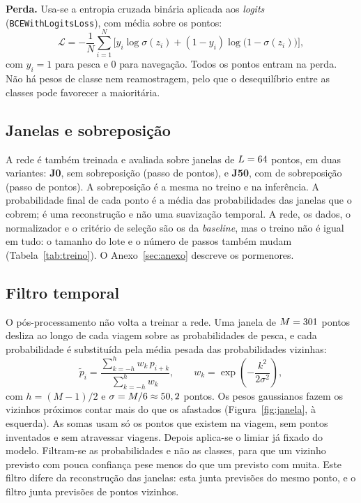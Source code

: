 \documentclass{article}
\begin{document}
\textbf{Perda.} Usa-se a entropia cruzada binária aplicada aos \emph{logits} (\texttt{BCEWithLogitsLoss}), com média sobre os pontos:
\begin{equation}
\mathcal{L}=-\frac1N\sum_{i=1}^{N}\Big[y_i\log\sigma(z_i)+(1-y_i)\log\big(1-\sigma(z_i)\big)\Big],
\end{equation}
com $y_i=1$ para pesca e $0$ para navegação. Todos os pontos entram na perda. Não há pesos de classe nem reamostragem, pelo que o desequilíbrio entre as classes pode favorecer a maioritária.

\subsection{Janelas e sobreposição}
\label{sec:janelas}

A rede é também treinada e avaliada sobre janelas de $L=64$ pontos, em duas variantes: \textbf{J0}, sem sobreposição (passo de \resJZPasso{} pontos), e \textbf{J50}, com \resJCSobrep{} de sobreposição (passo de \resJCPasso{} pontos). A sobreposição é a mesma no treino e na inferência. A probabilidade final de cada ponto é a média das probabilidades das janelas que o cobrem; é uma reconstrução e não uma suavização temporal. A rede, os dados, o normalizador e o critério de seleção são os da \emph{baseline}, mas o treino não é igual em tudo: o tamanho do lote e o número de passos também mudam (Tabela~\ref{tab:treino}). O Anexo~\ref{sec:anexo} descreve os pormenores.

\subsection{Filtro temporal}
\label{sec:filtro}

O pós-processamento não volta a treinar a rede. Uma janela de $M=301$ pontos desliza ao longo de cada viagem sobre as probabilidades de pesca, e cada probabilidade é substituída pela média pesada das probabilidades vizinhas:
\begin{equation}
\tilde{p}_i=\frac{\sum_{k=-h}^{h} w_k\,p_{i+k}}{\sum_{k=-h}^{h} w_k},\qquad w_k=\exp\!\left(-\frac{k^2}{2\sigma^2}\right),
\end{equation}
com $h=(M-1)/2$ e $\sigma=M/6\approx50,2$ pontos. Os pesos gaussianos fazem os vizinhos próximos contar mais do que os afastados (Figura~\ref{fig:janela}, à esquerda). As somas usam só os pontos que existem na viagem, sem pontos inventados e sem atravessar viagens. Depois aplica-se o limiar já fixado do modelo. Filtram-se as probabilidades e não as classes, para que um vizinho previsto com pouca confiança pese menos do que um previsto com muita. Este filtro difere da reconstrução das janelas: esta junta previsões do mesmo ponto, e o filtro junta previsões de pontos vizinhos.
\end{document}

